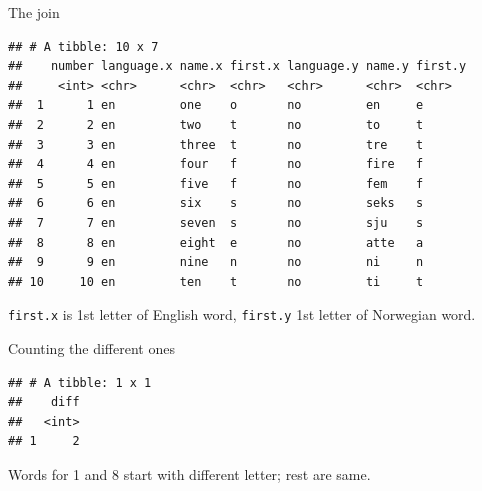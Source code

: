 \documentclass[ignorenonframetext,]{beamer}
\newenvironment{Shaded}{\begin{snugshade}}{\end{snugshade}}
\newcommand{\DataTypeTok}[1]{\textcolor[rgb]{0.13,0.29,0.53}{#1}}
\newcommand{\KeywordTok}[1]{\textcolor[rgb]{0.13,0.29,0.53}{\textbf{#1}}}
\newcommand{\NormalTok}[1]{#1}
\newcommand{\OperatorTok}[1]{\textcolor[rgb]{0.81,0.36,0.00}{\textbf{#1}}}
\newcommand{\StringTok}[1]{\textcolor[rgb]{0.31,0.60,0.02}{#1}}
\begin{document}
\begin{frame}[fragile]{The join}
\protect\hypertarget{the-join}{}

\begin{Shaded}
\end{Shaded}

\begin{verbatim}
## # A tibble: 10 x 7
##    number language.x name.x first.x language.y name.y first.y
##     <int> <chr>      <chr>  <chr>   <chr>      <chr>  <chr>  
##  1      1 en         one    o       no         en     e      
##  2      2 en         two    t       no         to     t      
##  3      3 en         three  t       no         tre    t      
##  4      4 en         four   f       no         fire   f      
##  5      5 en         five   f       no         fem    f      
##  6      6 en         six    s       no         seks   s      
##  7      7 en         seven  s       no         sju    s      
##  8      8 en         eight  e       no         atte   a      
##  9      9 en         nine   n       no         ni     n      
## 10     10 en         ten    t       no         ti     t
\end{verbatim}

\texttt{first.x} is 1st letter of English word, \texttt{first.y} 1st
letter of Norwegian word.

\end{frame}

\begin{frame}[fragile]{Counting the different ones}
\protect\hypertarget{counting-the-different-ones}{}

\begin{Shaded}
\end{Shaded}

\begin{verbatim}
## # A tibble: 1 x 1
##    diff
##   <int>
## 1     2
\end{verbatim}

Words for 1 and 8 start with different letter; rest are same.

\end{frame}
\end{document}
